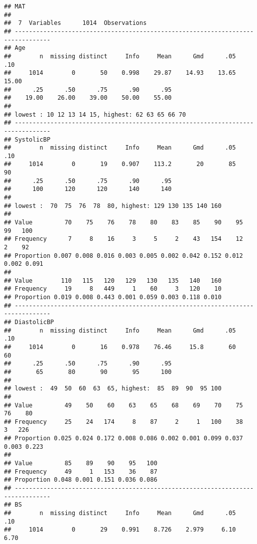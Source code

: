 \documentclass[
]{article}
\begin{document}
\begin{verbatim}
## MAT 
## 
##  7  Variables      1014  Observations
## --------------------------------------------------------------------------------
## Age 
##        n  missing distinct     Info     Mean      Gmd      .05      .10 
##     1014        0       50    0.998    29.87    14.93    13.65    15.00 
##      .25      .50      .75      .90      .95 
##    19.00    26.00    39.00    50.00    55.00 
## 
## lowest : 10 12 13 14 15, highest: 62 63 65 66 70
## --------------------------------------------------------------------------------
## SystolicBP 
##        n  missing distinct     Info     Mean      Gmd      .05      .10 
##     1014        0       19    0.907    113.2       20       85       90 
##      .25      .50      .75      .90      .95 
##      100      120      120      140      140 
## 
## lowest :  70  75  76  78  80, highest: 129 130 135 140 160
##                                                                             
## Value         70    75    76    78    80    83    85    90    95    99   100
## Frequency      7     8    16     3     5     2    43   154    12     2    92
## Proportion 0.007 0.008 0.016 0.003 0.005 0.002 0.042 0.152 0.012 0.002 0.091
##                                                           
## Value        110   115   120   129   130   135   140   160
## Frequency     19     8   449     1    60     3   120    10
## Proportion 0.019 0.008 0.443 0.001 0.059 0.003 0.118 0.010
## --------------------------------------------------------------------------------
## DiastolicBP 
##        n  missing distinct     Info     Mean      Gmd      .05      .10 
##     1014        0       16    0.978    76.46     15.8       60       60 
##      .25      .50      .75      .90      .95 
##       65       80       90       95      100 
## 
## lowest :  49  50  60  63  65, highest:  85  89  90  95 100
##                                                                             
## Value         49    50    60    63    65    68    69    70    75    76    80
## Frequency     25    24   174     8    87     2     1   100    38     3   226
## Proportion 0.025 0.024 0.172 0.008 0.086 0.002 0.001 0.099 0.037 0.003 0.223
##                                         
## Value         85    89    90    95   100
## Frequency     49     1   153    36    87
## Proportion 0.048 0.001 0.151 0.036 0.086
## --------------------------------------------------------------------------------
## BS 
##        n  missing distinct     Info     Mean      Gmd      .05      .10 
##     1014        0       29    0.991    8.726    2.979     6.10     6.70 

\end{verbatim}
\end{document}
